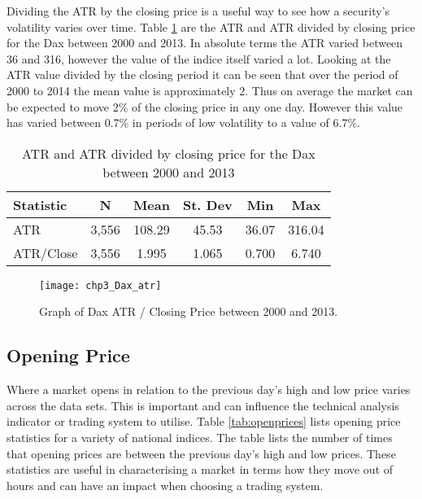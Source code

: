 Dividing the ATR by the closing price is a useful way to see how a security's volatility varies over time. Table \ref{tab:atr_dax} are the ATR and ATR divided by closing price for the Dax between 2000 and 2013. In absolute terms the ATR varied between 36 and 316, however the value of the indice itself varied a lot. Looking at the ATR value divided by the closing period it can be seen that over the period of 2000 to 2014 the mean value is approximately 2. Thus on average the market can be expected to move 2\% of the closing price in any one day. However this value has varied between 0.7\% in periods of low volatility to a value of 6.7\%.

\begin{table}[!htbp] \centering 
  \caption[Average True Range of Dax.]{ATR and ATR divided by closing price for the Dax between 2000 and 2013} 
  \label{tab:atr_dax} 
\begin{tabular}{lccccc} 
\toprule
Statistic & N & Mean & St. Dev & Min & Max \\ 
\midrule
ATR & 3,556 & 108.29 & 45.53 & 36.07 & 316.04 \\ 
ATR/Close & 3,556 & 1.995 & 1.065 & 0.700 & 6.740 \\ 
\bottomrule
\end{tabular} 
\end{table} 

\begin{figure}[tbph]
\centering
\texttt{[image: chp3\_Dax\_atr]}
\caption[Graph of Dax ATR / Closing Price.]{Graph of Dax ATR / Closing Price between 2000 and 2013.}
\label{fig:Dax_atr}
\end{figure}

\subsection{Opening Price}
Where a market opens in relation to the previous day's high and low price varies across the data sets. This is important and can influence the technical analysis indicator or trading system to utilise. Table \ref{tab:openprices} lists opening price statistics for a variety of national indices. The table lists the number of times that opening prices are between the previous day's high and low prices. These statistics are useful in characterising a market in terms how they move out of hours and can have an impact when choosing a trading system.

